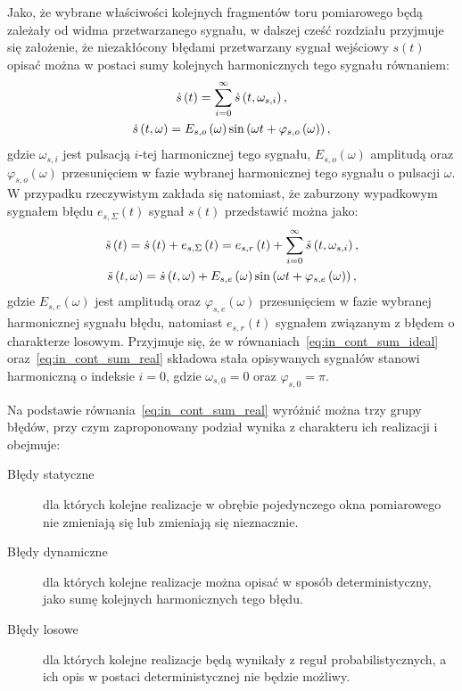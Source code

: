 Jako, że wybrane właściwości kolejnych fragmentów toru pomiarowego będą zależały od widma przetwarzanego sygnału, w dalszej cześć rozdziału przyjmuje się założenie, że niezakłócony błędami przetwarzany sygnał wejściowy $s(t)$ opisać można w postaci sumy kolejnych harmonicznych tego sygnału równaniem:
\begin{gather}
\dot{s} \left(t\right) = \sum _{i = 0} ^{\infty} \dot{s} \left( t, \omega_{s,i} \right) \label{eq:in_cont_sum_ideal}, \\
\dot{s} \left( t, \omega \right) = E_{s,o} \left(\omega\right) \sin \left( \omega t + \varphi_{s,o} \left(\omega\right) \right) \label{eq:in_cont_omega_ideal},
\end{gather}
gdzie $\omega_{s,i}$ jest pulsacją $i$-tej harmonicznej tego sygnału, $E_{s,o}(\omega)$ amplitudą oraz $\varphi_{s,o}(\omega)$ przesunięciem w fazie wybranej harmonicznej tego sygnału o pulsacji $\omega$. W przypadku rzeczywistym zakłada się natomiast, że zaburzony wypadkowym sygnałem błędu $e_{s,\Sigma}(t)$ sygnał $s(t)$ przedstawić można jako:
\begin{gather}
\tilde{s} \left(t\right) = \dot{s} \left(t\right) + e_{s,\Sigma} \left(t\right) = e_{s,r} \left(t\right) + \sum _{i = 0} ^{\infty} \tilde{s} \left( t, \omega_{s,i} \right) \label{eq:in_cont_sum_real}, \\
\tilde{s} \left( t, \omega \right) = \dot{s} \left( t, \omega \right) + E_{s,e} \left(\omega\right) \sin \left( \omega t + \varphi_{s,e} \left(\omega\right) \right) \label{eq:in_cont_omega_real},
\end{gather}
gdzie $E_{s,e}(\omega)$ jest amplitudą oraz $ \varphi_{s,e}(\omega)$ przesunięciem w fazie wybranej harmonicznej sygnału błędu, natomiast $e_{s,r}(t)$ sygnałem związanym z błędem o charakterze losowym. Przyjmuje się, że w równaniach~\eqref{eq:in_cont_sum_ideal} oraz~\eqref{eq:in_cont_sum_real} składowa stała opisywanych sygnałów stanowi harmoniczną o indeksie $i = 0$, gdzie $\omega_{s,0} = 0$ oraz $\varphi_{s,0} = \pi$.

Na podstawie równania~\eqref{eq:in_cont_sum_real} wyróżnić można trzy grupy błędów, przy czym zaproponowany podział wynika z charakteru ich realizacji i obejmuje:
\begin{description}
\item [Błędy statyczne] dla których kolejne realizacje w obrębie pojedynczego okna pomiarowego nie zmieniają się lub zmieniają się nieznacznie.
\item [Błędy dynamiczne] dla których kolejne realizacje można opisać w sposób deterministyczny, jako sumę kolejnych harmonicznych tego błędu.
\item [Błędy losowe] dla których kolejne realizacje będą wynikały z reguł probabilistycznych, a ich opis w postaci deterministycznej nie będzie możliwy.
\end{description}


